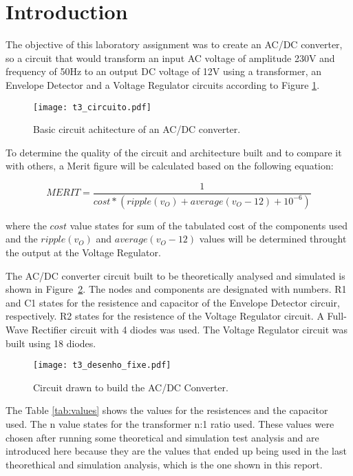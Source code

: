 \newpage
\section{Introduction}
\label{sec:introduction}

The objective of this laboratory assignment was to create an AC/DC converter, so a circuit that would transform an input AC voltage of amplitude 230V and frequency of 50Hz to an output DC voltage of 12V using a transformer, an Envelope Detector and a Voltage Regulator circuits according to Figure \ref{fig:t3}. 

\begin{figure}[h] \centering
	\texttt{[image: t3\_circuito.pdf]}
	\vspace{-4.8cm}
	\caption{Basic circuit achitecture of an AC/DC converter.}
	\label{fig:t3}
\end{figure}

To determine the quality of the circuit and architecture built and to compare it with others, a Merit figure will be calculated based on the following equation: 

\begin {equation}
MERIT = \frac{1}{cost*(ripple(v_O) + average(v_O - 12) + 10^{-6})}   	
\label{eq:merit}
\end{equation}

where the $cost$ value states for sum of the tabulated cost of the components used and the $ripple(v_O)$ and $average(v_O-12)$ values will be determined throught the output at the Voltage Regulator.

The AC/DC converter circuit built to be theoretically analysed and simulated is shown in Figure~\ref{fig:t3_circuit}. The nodes and components are designated with numbers. R1 and C1 states for the resistence and capacitor of the Envelope Detector circuir, respectively. R2 states for the resistence of the Voltage Regulator circuit. A Full-Wave Rectifier circuit with 4 diodes was used. The Voltage Regulator circuit was built using 18 diodes.

\begin{figure}[H] \centering
	\texttt{[image: t3\_desenho\_fixe.pdf]}
	\vspace{-9cm}
	\caption{Circuit drawn to build the AC/DC Converter.}
	\label{fig:t3_circuit}
\end{figure}

The Table \ref{tab:values} shows the values for the resistences and the capacitor used. The n value states for the transformer n:1 ratio used. These values were chosen after running some theoretical and simulation test analysis and are introduced here because they are the values that ended up being used in the last theorethical and simulation analysis, which is the one shown in this report.

